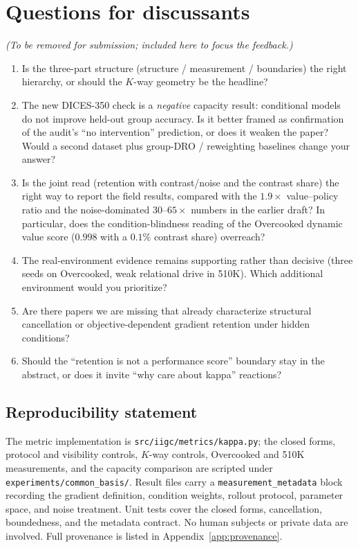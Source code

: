 \documentclass{article}
\begin{document}
\section*{Questions for discussants}
\label{sec:questions}
\emph{(To be removed for submission; included here to focus the feedback.)}
\begin{enumerate}
\item Is the three-part structure (structure / measurement / boundaries) the
  right hierarchy, or should the $K$-way geometry be the headline?
\item The new DICES-350 check is a \emph{negative} capacity result: conditional
  models do not improve held-out group accuracy. Is it better framed as
  confirmation of the audit's ``no intervention'' prediction, or does it
  weaken the paper? Would a second dataset plus group-DRO / reweighting
  baselines change your answer?
\item Is the joint read (retention with contrast/noise and the contrast
  share) the right way to report the field results, compared with the
  $1.9\times$ value--policy ratio and the noise-dominated $30$--$65\times$
  numbers in the earlier draft? In particular, does the
  condition-blindness reading of the Overcooked dynamic value score
  ($0.998$ with a $0.1\%$ contrast share) overreach?
\item The real-environment evidence remains supporting rather than decisive
  (three seeds on Overcooked, weak relational drive in 510K). Which additional
  environment would you prioritize?
\item Are there papers we are missing that already characterize structural
  cancellation or objective-dependent gradient retention under hidden
  conditions?
\item Should the ``retention is not a performance score'' boundary stay in the
  abstract, or does it invite ``why care about kappa'' reactions?
\end{enumerate}

\subsection*{Reproducibility statement}

The metric implementation is \texttt{src/iigc/metrics/kappa.py}; the closed
forms, protocol and visibility controls, $K$-way controls, Overcooked and 510K
measurements, and the capacity comparison are scripted under
\texttt{experiments/common\_basis/}. Result files carry a
\texttt{measurement\_metadata} block recording the gradient definition,
condition weights, rollout protocol, parameter space, and noise treatment.
Unit tests cover the closed forms, cancellation, boundedness, and the
metadata contract. No human subjects or private data are involved. Full
provenance is listed in Appendix~\ref{app:provenance}.
\end{document}
